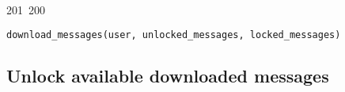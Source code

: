 201~200~\documentclass{article}
\begin{document}
\begin{lstlisting}[language=Python, caption=Download new messages]
	                                                                                                                                                                                                                                                                                                	                                                                                                                                        	    	                                                                                                	                                                                                                                        download_messages(user, unlocked_messages, locked_messages)
	                                                                                                                                                                                                                                                                                                	                                                                                                                                        	    	                                                                                                	                                                                                                                        \end{lstlisting}


	                                                                                                                                                                                                                                                                                                	                                                                                                                                        	    	                                                                                                	                                                                                                                        \subsection{Unlock available downloaded messages}
\end{document}
